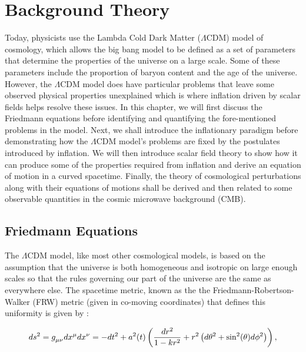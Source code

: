 \documentclass[a4paper,12pt,twoside]{report}
\begin{document}

\chapter{Background Theory}
\label{chap:BgTheory}

Today, physicists use the Lambda Cold Dark Matter ($\Lambda$CDM) model of cosmology, which allows the big bang model to be defined as a set of parameters that determine the properties of the universe on a large scale. Some of these parameters include the proportion of baryon content and the age of the universe. However, the $\Lambda$CDM model does have particular problems that leave some observed physical properties unexplained which is where inflation driven by scalar fields helps resolve these issues. In this chapter, we will first discuss the Friedmann equations before identifying and quantifying the fore-mentioned problems in the model. Next, we shall introduce the inflationary paradigm before demonstrating how the $\Lambda$CDM model's problems are fixed by the postulates introduced by inflation. We will then introduce scalar field theory to show how it can produce some of the properties required from inflation and derive an equation of motion in a curved spacetime. Finally, the theory of cosmological perturbations along with their equations of motions shall be derived and then related to some observable quantities in the cosmic microwave background (CMB). 

\section{Friedmann Equations}\label{sec:FriEqs}

The $\Lambda$CDM model, like most other cosmological models, is based on the assumption that the universe is both homogeneous and isotropic on large enough scales so that the rules governing our part of the universe are the same as everywhere else. The spacetime metric, known as the the Friedmann-Robertson-Walker (FRW) metric (given in co-moving coordinates) that defines this uniformity is given by \cite{hobson2006general}:

\begin{equation}
ds^{2} = \tensor{g}{_{\mu \nu}}dx^{\mu}dx^{\nu} = -dt^{2} + a^{2}(t) \left( \frac{dr^{2}}{1 - kr^{2}} + r^{2} \left( d\theta^{2} + \sin^{2}(\theta) d\phi^{2} \right) \right), \label{eq2.1}
\end{equation}
\end{document}
